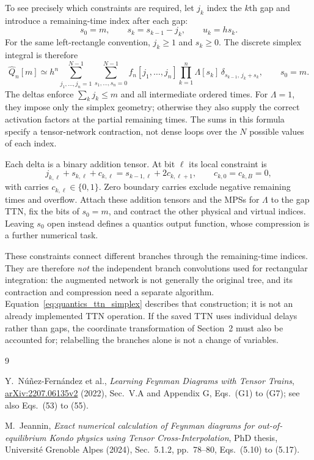 \documentclass[11pt]{article}
\begin{document}
To see precisely which constraints are required, let $j_k$ index the
$k$th gap and introduce a remaining-time index after each gap:
\begin{equation}
    s_0=m,\qquad s_k=s_{k-1}-j_k,
    \qquad u_k=hs_k.
\end{equation}
For the same left-rectangle convention, $j_k\geq1$ and $s_k\geq0$.
The discrete simplex integral is therefore
\begin{equation}
    \boxed{\widehat Q_n[m]\simeq h^n
    \sum_{j_1,\ldots,j_n=1}^{N-1}
    \sum_{s_1,\ldots,s_n=0}^{N-1}
    f_n[j_1,\ldots,j_n]
    \prod_{k=1}^n\Lambda[s_k]\,
        \delta_{s_{k-1},\,j_k+s_k},\qquad s_0=m.}
    \label{eq:quantics_ttn_simplex}
\end{equation}
The deltas enforce $\sum_k j_k\leq m$ and all intermediate ordered times.
For $\Lambda=1$, they impose only the simplex geometry; otherwise they
also supply the correct activation factors at the partial remaining times.
The sums in this formula specify a tensor-network contraction, not dense
loops over the $N$ possible values of each index.

Each delta is a binary addition tensor. At bit $\ell$ its local constraint is
\begin{equation}
    j_{k,\ell}+s_{k,\ell}+c_{k,\ell}
       =s_{k-1,\ell}+2c_{k,\ell+1},
    \qquad c_{k,0}=c_{k,B}=0,
\end{equation}
with carries $c_{k,\ell}\in\{0,1\}$. Zero boundary carries exclude
negative remaining times and overflow. Attach these addition tensors and
the MPSs for $\Lambda$ to the gap TTN, fix the bits of $s_0=m$, and
contract the other physical and virtual indices. Leaving $s_0$ open
instead defines a quantics output function, whose compression is a further
numerical task.

These constraints connect different branches through the remaining-time
indices. They are therefore \emph{not} the independent branch convolutions
used for rectangular integration: the augmented network is not generally
the original tree, and its contraction and compression need a separate
algorithm. Equation~\eqref{eq:quantics_ttn_simplex} describes that
construction; it is not an already implemented TTN operation.
If the saved TTN uses individual delays rather than gaps, the coordinate
transformation of Section~2 must also be accounted for; relabelling the
branches alone is not a change of variables.

\begin{thebibliography}{9}
\raggedright%
Y.~N\'u\~nez-Fern\'andez et al.,
\emph{Learning Feynman Diagrams with Tensor Trains},
\href{https://arxiv.org/abs/2207.06135v2}{arXiv:2207.06135v2} (2022),
Sec.~V.A and Appendix G, Eqs.~(G1) to (G7);
see also Eqs.~(53) to (55).

M.~Jeannin,
\emph{Exact numerical calculation of Feynman diagrams for
out-of-equilibrium Kondo physics using Tensor Cross-Interpolation},
PhD thesis, Universit\'e Grenoble Alpes (2024),
Sec.~5.1.2, pp.~78--80, Eqs.~(5.10) to (5.17).
\end{thebibliography}
\end{document}
